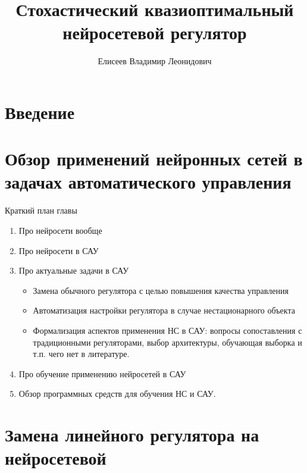\documentclass[12pt]{rusthesis}
\title{Стохастический квазиоптимальный нейросетевой регулятор}
\author{Елисеев Владимир Леонидович}
\begin{document}

\setcounter{tocdepth}{3}\tableofcontents

\chapter*{Введение}

%

\chapter{Обзор применений нейронных сетей в задачах автоматического управления}
\centerline{Краткий план главы}
\begin{enumerate}
\item Про нейросети вообще
\item Про нейросети в САУ
\item Про актуальные задачи в САУ
  \begin{itemize}
  \item Замена обычного регулятора с целью повышения качества управления
  \item Автоматизация настройки регулятора в случае нестационарного объекта
  \item Формализация аспектов применения НС в САУ: вопросы
    сопоставления с традиционными регуляторами, выбор архитектуры,
    обучающая выборка и т.п. чего нет в литературе.
  \end{itemize}
\item Про обучение применению нейросетей в САУ
\item Обзор программных средств для обучения НС и САУ.
\end{enumerate}

%

\chapter{Замена линейного регулятора на нейросетевой}
%
\end{document}
